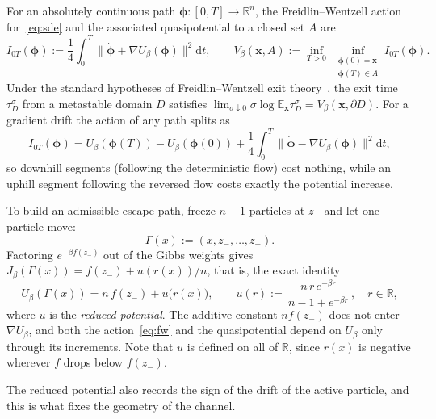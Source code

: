 \documentclass{article}
\newcommand{\dd}{\mathrm d}
\theoremstyle{plain}
\theoremstyle{definition}
\theoremstyle{remark}
\newcommand{\R}{\mathbb{R}}
\newcommand{\E}{\mathbb{E}}
\newcommand{\xx}{\mathbf{x}}
\begin{document}
For an absolutely continuous path \(\boldsymbol\phi:[0,T]\to\R^n\), the Freidlin--Wentzell action for~\eqref{eq:sde} and the associated quasipotential to a closed set \(A\) are
\begin{equation}
    I_{0T}(\boldsymbol\phi) :=\frac14\int_0^T\bigl\|\dot{\boldsymbol\phi}+\nabla U_\beta(\boldsymbol\phi)\bigr\|^2\dd t,
    \qquad
    V_\beta(\xx,A):=\inf_{T>0}\ \inf_{\substack{\boldsymbol\phi(0)=\xx\\ \boldsymbol\phi(T)\in A}}I_{0T}(\boldsymbol\phi).
    \label{eq:fw}
\end{equation}
Under the standard hypotheses of Freidlin--Wentzell exit theory~\cite{freidlin2012random}, the exit time \(\tau_D^\sigma\) from a metastable domain \(D\) satisfies \(\lim_{\sigma\downarrow0}\sigma\log\E_\xx\tau_D^\sigma=V_\beta(\xx,\partial D)\). For a gradient drift the action of any path splits as
\begin{equation}
    I_{0T}(\boldsymbol\phi)
    =U_\beta(\boldsymbol\phi(T))-U_\beta(\boldsymbol\phi(0))
    +\frac14\int_0^T\bigl\|\dot{\boldsymbol\phi}-\nabla U_\beta(\boldsymbol\phi)\bigr\|^2\dd t,
    \label{eq:gradient-decomposition}
\end{equation}
so downhill segments (following the deterministic flow) cost nothing, while an uphill segment following the reversed flow costs exactly the potential increase.
 
To build an admissible escape path, freeze \(n-1\) particles at \(z_-\) and let one particle move:
\begin{equation}
    \Gamma(x):=(x,z_-,\dots,z_-).
    \label{eq:channel}
\end{equation}
Factoring \(e^{-\beta f(z_-)}\) out of the Gibbs weights gives \(J_\beta(\Gamma(x))=f(z_-)+u(r(x))/n\), that is, the exact identity
\begin{equation}
    U_\beta(\Gamma(x))=n\,f(z_-)+u\bigl(r(x)\bigr),
    \qquad
    u(r):=\frac{n\,r\,e^{-\beta r}}{\,n-1+e^{-\beta r}\,},
    \quad r\in\R,
    \label{eq:reduced-potential}
\end{equation}
where \(u\) is the \emph{reduced potential}. The additive constant \(n f(z_-)\) does not enter \(\nabla U_\beta\), and both the action~\eqref{eq:fw} and the quasipotential depend on \(U_\beta\) only through its increments. Note that \(u\) is defined on all of \(\R\), since \(r(x)\) is negative wherever \(f\) drops below \(f(z_-)\).
 
The reduced potential also records the sign of the drift of the active particle, and this is what fixes the geometry of the channel.
 
\end{document}
